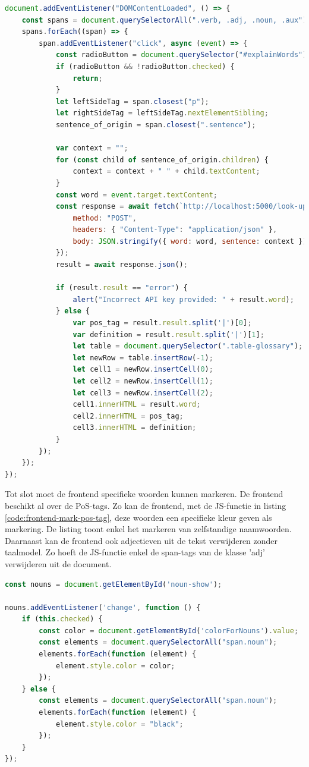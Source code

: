 \begin{lstlisting}[language=javascript, caption={Een woord aan de woordenlijst toevoegen in het scholierencomponent.}, label={code:frontend-add-word-to-glossary}]
document.addEventListener("DOMContentLoaded", () => {
	const spans = document.querySelectorAll(".verb, .adj, .noun, .aux");
	spans.forEach((span) => {
		span.addEventListener("click", async (event) => {
			const radioButton = document.querySelector("#explainWords");
			if (radioButton && !radioButton.checked) {
				return;
			}
			let leftSideTag = span.closest("p");
			let rightSideTag = leftSideTag.nextElementSibling;
			sentence_of_origin = span.closest(".sentence");
			
			var context = "";
			for (const child of sentence_of_origin.children) {
				context = context + " " + child.textContent;
			}
			const word = event.target.textContent;
			const response = await fetch(`http://localhost:5000/look-up-word`, {
				method: "POST",
				headers: { "Content-Type": "application/json" },
				body: JSON.stringify({ word: word, sentence: context }),
			});
			result = await response.json();
			
			if (result.result == "error") {
				alert("Incorrect API key provided: " + result.word);
			} else {
				var pos_tag = result.result.split('|')[0];
				var definition = result.result.split('|')[1];
				let table = document.querySelector(".table-glossary");
				let newRow = table.insertRow(-1);
				let cell1 = newRow.insertCell(0);
				let cell2 = newRow.insertCell(1);
				let cell3 = newRow.insertCell(2);
				cell1.innerHTML = result.word;
				cell2.innerHTML = pos_tag;
				cell3.innerHTML = definition;
			}
		});
	});
});
\end{lstlisting}


Tot slot moet de frontend specifieke woorden kunnen markeren. De frontend beschikt al over de PoS-tags. Zo kan de frontend, met de JS-functie in listing \ref{code:frontend-mark-pos-tag}, deze woorden een specifieke kleur geven als markering. De listing toont enkel het markeren van zelfstandige naamwoorden. Daarnaast kan de frontend ook adjectieven uit de tekst verwijderen zonder taalmodel. Zo hoeft de JS-functie enkel de span-tags van de klasse 'adj' verwijderen uit de document.

\begin{lstlisting}[language=javascript, caption={Zelfstandige naamwoorden in het scholierencomponent markeren.}, label={code:frontend-mark-pos-tag}]
const nouns = document.getElementById('noun-show');

nouns.addEventListener('change', function () {
	if (this.checked) {
		const color = document.getElementById('colorForNouns').value;
		const elements = document.querySelectorAll("span.noun");
		elements.forEach(function (element) {
			element.style.color = color;
		});
	} else {
		const elements = document.querySelectorAll("span.noun");
		elements.forEach(function (element) {
			element.style.color = "black";
		});
	}
});
\end{lstlisting}


